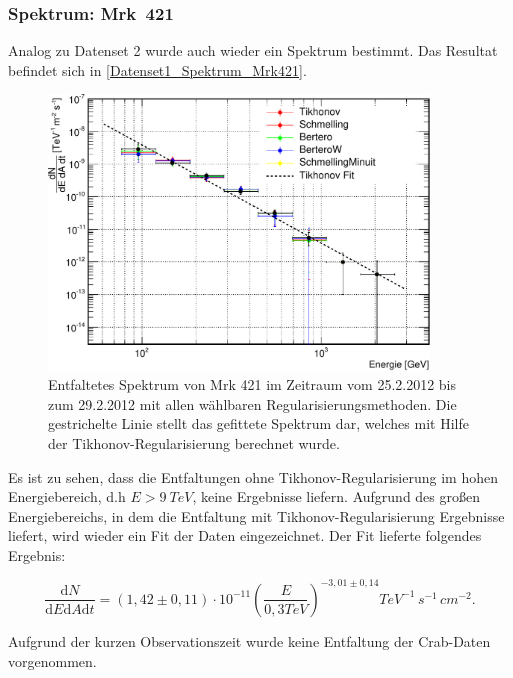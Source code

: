 \FloatBarrier

\subsubsection{Spektrum: Mrk~421}
Analog zu Datenset 2 wurde auch wieder ein Spektrum bestimmt.
Das Resultat befindet sich in \autoref{Datenset1_Spektrum_Mrk421}.

\begin{figure}
    \centering
    \includegraphics[width=0.9\textwidth]{./Plots/04_MrkAnalyse/Datenset1/Spektrum_Mrk421.pdf}
    \caption{Entfaltetes Spektrum von Mrk 421 im Zeitraum vom 25.2.2012 bis zum 29.2.2012 mit allen wählbaren Regularisierungsmethoden.
    Die gestrichelte Linie stellt das gefittete Spektrum dar, welches mit Hilfe der Tikhonov-Regularisierung berechnet wurde.}
    \label{Datenset1_Spektrum_Mrk421}
\end{figure}

Es ist zu sehen, dass die Entfaltungen ohne Tikhonov-Regularisierung im hohen Energiebereich, d.h $E>\SI{9}{TeV}$, keine Ergebnisse liefern.
Aufgrund des großen Energiebereichs, in dem die Entfaltung mit Tikhonov-Regularisierung Ergebnisse liefert, wird wieder ein Fit der Daten eingezeichnet.
Der Fit lieferte folgendes Ergebnis:

\begin{equation}
 \frac{\mathrm{d}N}{\mathrm{d}E\mathrm{d}A\mathrm{d}t}=(1,42 \pm 0,11) \cdot 10^{-11}\left( \frac{E}{0,3 \si{TeV}} \right)^{-3,01\pm 0,14} \si{TeV^{-1}\,s^{-1}\,cm^{-2}}.
\end{equation}

Aufgrund der kurzen Observationszeit wurde keine Entfaltung der Crab-Daten vorgenommen.

